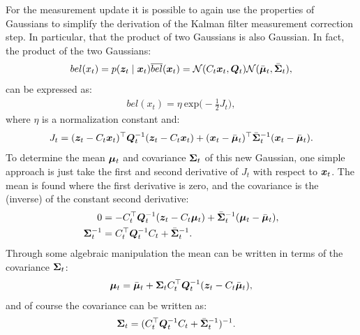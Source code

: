 For the measurement update it is possible to again use the properties of Gaussians to simplify the derivation of the Kalman filter measurement correction step. In particular, that the product of two Gaussians is also Gaussian. In fact, the product of the two Gaussians:
\begin{equation*}
\begin{split}
bel(x_t) = p(\bm{z}_t \mid \bm{x}_t)\overline{bel}(\bm{x}_t) &= \mathcal{N}(C_t\bm{x}_t,\bm{Q}_t) \mathcal{N}(\bar{\bm{\mu}}_{t},\bar{\bm{\Sigma}}_{t}), \\
\end{split}
\end{equation*}
can be expressed as:
\begin{equation*}
\begin{split}
bel(x_t) = \eta\: \text{exp}\big(-\frac{1}2 J_t \big),
\end{split}
\end{equation*}
where $\eta$ is a normalization constant and:
\begin{equation*}
    J_t = (\bm{z}_t-C_t\bm{x}_t)^\top  \bm{Q}_t^{-1} (\bm{z}_t-C_t\bm{x}_t) + (\bm{x}_t-\bar{\bm{\mu}}_t)^\top  \bar{\bm{\Sigma}}_t^{-1} (\bm{x}_t-\bar{\bm{\mu}}_t).
\end{equation*}
To determine the mean $\bm{\mu}_t$ and covariance $\bm{\Sigma}_t$ of this new Gaussian, one simple approach is just take the first and second derivative of $J_t$ with respect to $\bm{x}_t$. The mean is found where the first derivative is zero, and the covariance is the (inverse) of the constant second derivative:
\begin{equation*}
\begin{split}
0 &= -C_t^\top  \bm{Q}_t^{-1}(\bm{z}_t - C_t \bm{\mu}_t) + \bar{\bm{\Sigma}}_t^{-1}(\bm{\mu}_t - \bar{\bm{\mu}}_t), \\   
\bm{\Sigma}_t^{-1} &= C_t^\top  \bm{Q}_t^{-1} C_t + \bar{\bm{\Sigma}}_t^{-1}.
\end{split}
\end{equation*}
Through some algebraic manipulation the mean can be written in terms of the covariance $\bm{\Sigma}_t$:
\begin{equation*}
\begin{split}
\bm{\mu}_t &= \bar{\bm{\mu}}_t + \bm{\Sigma}_t C_t^\top  \bm{Q}_t^{-1}(\bm{z}_t - C_t \bar{\bm{\mu}}_t), \\
\end{split}
\end{equation*}
and of course the covariance can be written as:
\begin{equation*}
\begin{split}
\bm{\Sigma}_t &= (C_t^\top  \bm{Q}_t^{-1} C_t + \bar{\bm{\Sigma}}_t^{-1})^{-1}.
\end{split}
\end{equation*}
